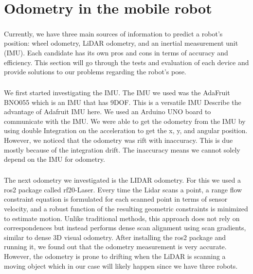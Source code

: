 \chapter{Odometry in the mobile robot}


\paragraph*{}

Currently, we have three main sources of information to predict a robot's position: wheel odometry, LiDAR odometry, and an inertial measurement unit (IMU). Each candidate has its own pros and cons in terms of accuracy and efficiency. This section will go through the tests and evaluation of each device and provide solutions to our problems regarding the robot's pose.
\paragraph*{}
We first started investigating the IMU. The IMU we used was the AdaFruit BNO055 which is an IMU that has 9DOF. This is a versatile IMU {Describe the advantage of Adafruit IMU here}. We used an Arduino UNO board to communicate with the IMU. We were able to get the odometry from the IMU by using double Integration on the acceleration to get the x, y, and angular position. However, we noticed that the odometry was rift with inaccuracy. This is due mostly because of the integration drift. The inaccuracy means we cannot solely depend on the IMU for odometry.

\paragraph*{}
The next odometry we investigated is the LIDAR odometry. For this we used a ros2 package called rf20-Laser. Every time the Lidar scans a point, a range flow constraint equation is formulated for each scanned point in terms of sensor velocity, and a robust function of the resulting geometric constraints is minimized to estimate motion. Unlike traditional methods, this approach does not rely on correspondences but instead performs dense scan alignment using scan gradients, similar to dense 3D visual odometry. After installing the ros2 package and running it, we found out that the odometry measurement is very accurate. However, the odometry is prone to drifting when the LiDAR is scanning a moving object which in our case will likely happen since we have three robots. 

